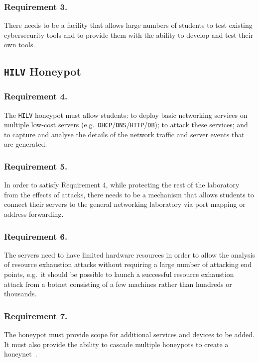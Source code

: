 \documentclass{llncs}
\begin{document}
\subsubsection{Requirement 3.} 
There needs to be a facility that allows large numbers of students to test
existing cybersecurity tools and to provide them with the ability to develop
and test their own tools.

\subsection{\texttt{HILV} Honeypot}\label{subsec:ResearchHoneypot}

\subsubsection{Requirement 4.} 
The \texttt{HILV} honeypot must allow students: to deploy basic networking services
on multiple low-cost servers
(e.g.\ \texttt{DHCP}/\texttt{DNS}/\texttt{HTTP}/\texttt{DB}); to attack these
services; and to capture and analyse the details of the network traffic
and server events that are generated.

\subsubsection{Requirement 5.} 
In order to satisfy Requirement 4, while protecting the rest of the laboratory
from the effects of attacks, there needs to be a mechanism that allows students
to connect their servers to the general networking laboratory via port mapping
or address forwarding.

\subsubsection{Requirement 6.} 
The servers need to have limited hardware resources in order to allow the
analysis of resource exhaustion attacks without requiring a large number of
attacking end points, e.g.\ it should be possible to launch a successful
resource exhaustion attack from a botnet consisting of a few machines rather
than hundreds or thousands.

\subsubsection{Requirement 7.} 
The honeypot must provide scope for additional services and devices to be
added. It must also provide the ability to cascade multiple honeypots to create
a honeynet~\cite{AA:15,FDF:15,KNC:15}.
\end{document}
